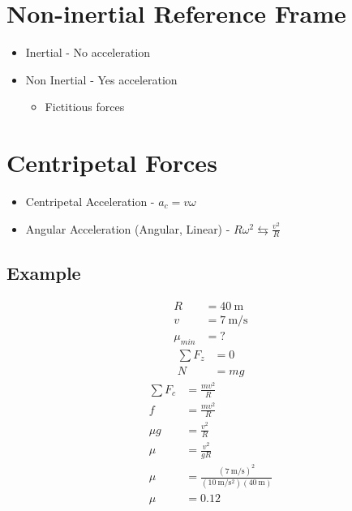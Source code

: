 \documentclass{article}
\begin{document}
\newcommand{\hr}{\par\noindent\rule{\textwidth}{0.4pt}}

\newcommand{\bc}[1]{
	\begin{equation*}
		\begin{boxed}
			{#1}
		\end{boxed}
	\end{equation*}
}

\newcommand{\cond}[2]{
	\ifmmode
		{#1} \quad {#2}
	\else
		$$ {#1} \quad {#2} $$
	\fi
}

\tableofcontents

\section{Non-inertial Reference Frame}

\begin{itemize}
	\item Inertial - No acceleration
	\item Non Inertial - Yes acceleration
		\begin{itemize}
			\item Fictitious forces
		\end{itemize}
\end{itemize}

\section{Centripetal Forces}

\begin{itemize}
	\item Centripetal Acceleration - $ a_c = v\omega $
	\item Angular Acceleration (Angular, Linear) - $ R\omega^2 \leftrightarrows \frac{v^2}{R} $
\end{itemize}

\subsection{Example}

\begin{align*}
	R & = \SI{40}{\meter} \\
	v & = \SI{7}{\meter \per \second} \\
	\mu_{min} & = ?
\end{align*}
\begin{align*}
	\sum F_z & = 0 \\
	N & = mg
\end{align*}
\begin{align*}
	\sum F_c & = \frac{mv^2}{R} \\
	f & = \frac{mv^2}{R} \\
	\mu g & = \frac{v^2}{R} \\
	\mu & = \frac{v^2}{gR} \\
	\mu & = \frac{(\SI{7}{\meter \per \second})^2}{(\SI{10}{\meter \per \second \squared})(\SI{40}{\meter})} \\
	\mu & = 0.12
\end{align*}
\end{document}
